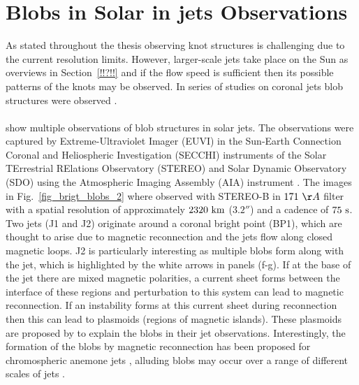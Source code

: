 \documentclass[12pt]{ociamthesis}
\newcommand{\np}{\\ \\}
\begin{document}
\section{Blobs in Solar in jets Observations}
\label{sec:EUV_jets}
As stated throughout the thesis observing knot structures is challenging due to the current resolution limits. However, larger-scale jets take place on the Sun as overviews in Section~\ref{!!?!!} and if the flow speed is sufficient then its possible patterns of the knots may be observed. In series of studies on coronal jets blob structures were observed \citep{Zhang2014AA567A11Z, Zhang2016SoPh291859Z, Chen2015ApJ81571C, Chen2017ApJ84054C}.  \np
%
\cite{Zhang2016SoPh291859Z} show multiple observations of blob structures in solar jets. The observations were captured by Extreme-Ultraviolet Imager (EUVI) in the Sun-Earth Connection Coronal and Heliospheric Investigation (SECCHI) \citep{Howard2008SSRv13667H} instruments of the Solar TErrestrial RElations Observatory (STEREO) \citep{Kaiser2005AdSpR361483K} and Solar Dynamic Observatory (SDO) using the Atmospheric Imaging Assembly (AIA) instrument \citep{Lemen2012SoPh27517L}. The images in Fig.~\ref{fig_brigt_blobs_2} where observed with STEREO-B in $171~\AA$ filter with a spatial resolution of approximately $2320~\rm{km}$ ($\ang{;;3.2}$) and a cadence of $75~\rm{s}$. Two jets (J1 and J2) originate around a coronal bright point (BP1), which are thought to arise due to magnetic reconnection \citep{Priest1994ApJ427459P, Mandrini1996SoPh168115M, Longcope1998ApJ507433L, Santos2007ASTRA329S} and the jets flow along closed magnetic loops. J2 is particularly interesting as multiple blobs form along with the jet, which is highlighted by the white arrows in panels (f-g). If at the base of the jet there are mixed magnetic polarities, a current sheet forms between the interface of these regions and perturbation to this system can lead to magnetic reconnection. If an instability forms at this current sheet during reconnection then this can lead to plasmoids (regions of magnetic islands)\citep{Drake2006Natur443553D}. These plasmoids are proposed by \cite{Zhang2016SoPh291859Z} to explain the blobs in their jet observations. Interestingly, the formation of the blobs by magnetic reconnection has been proposed for chromospheric anemone jets \citep{Singh2012ApJ75933S}, alluding blobs may occur over a range of different scales of jets \citep{Zhang2016SoPh291859Z}.\np 
\end{document}
